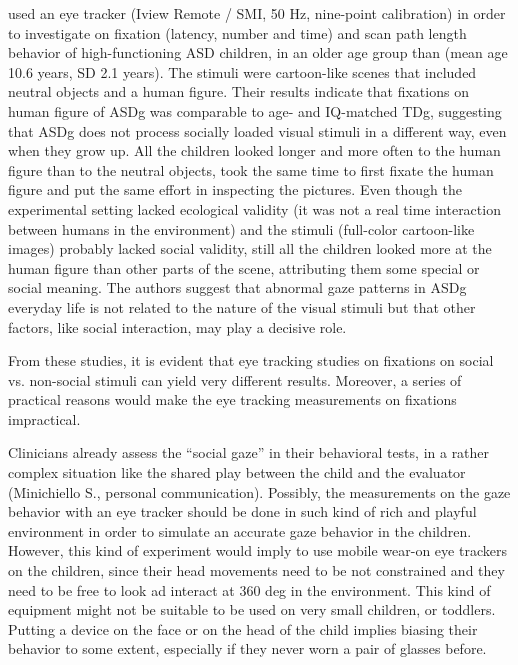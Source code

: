 \cite{vandergeest2002humanfigures} used an eye tracker (Iview Remote / SMI, 50 Hz, nine-point calibration) in order to investigate on fixation (latency, number and time) and scan path length behavior of high-functioning ASD children, in an older age group than \cite{young2009gazechildren} (mean age 10.6 years, SD 2.1 years). The stimuli were cartoon-like scenes that included neutral objects and a human figure. Their results indicate that fixations on human figure of ASDg was comparable to age- and IQ-matched TDg, suggesting that ASDg does not process socially loaded visual stimuli in a different way, even when they grow up. All the children looked longer and more often to the human figure than to the neutral objects, took the same time to first fixate the human figure and put the same effort in inspecting the pictures. Even though the experimental setting lacked ecological validity (it was not a real time interaction between humans in the environment) and the stimuli (full-color cartoon-like images) probably lacked social validity, still all the children looked more at the human figure than other parts of the scene, attributing them some special or social meaning. The authors suggest that abnormal gaze patterns in ASDg everyday life is not related to the nature of the visual stimuli but that other factors, like social interaction, may play a decisive role.

From these studies, it is evident that eye tracking studies on fixations on social vs. non-social stimuli can yield very different results. Moreover, a series of practical reasons would make the eye tracking measurements on fixations impractical.

Clinicians already assess the “social gaze” in their behavioral tests, in a rather complex situation like the shared play between the child and the evaluator (Minichiello S., personal communication). Possibly, the measurements on the gaze behavior with an eye tracker should be done in such kind of rich and playful environment in order to simulate an accurate gaze behavior in the children. However, this kind of experiment would imply to use mobile wear-on eye trackers on the children, since their head movements need to be not constrained and they need to be free to look ad interact at 360 deg in the environment. This kind of equipment might not be suitable to be used on very small children, or toddlers. Putting a device on the face or on the head of the child implies biasing their behavior to some extent, especially if they never worn a pair of glasses before.

